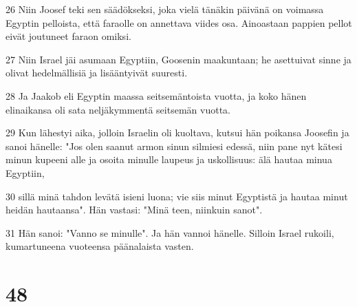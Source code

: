 \par 26 Niin Joosef teki sen säädökseksi, joka vielä tänäkin päivänä on voimassa Egyptin pelloista, että faraolle on annettava viides osa. Ainoastaan pappien pellot eivät joutuneet faraon omiksi.
\par 27 Niin Israel jäi asumaan Egyptiin, Goosenin maakuntaan; he asettuivat sinne ja olivat hedelmällisiä ja lisääntyivät suuresti.
\par 28 Ja Jaakob eli Egyptin maassa seitsemäntoista vuotta, ja koko hänen elinaikansa oli sata neljäkymmentä seitsemän vuotta.
\par 29 Kun lähestyi aika, jolloin Israelin oli kuoltava, kutsui hän poikansa Joosefin ja sanoi hänelle: "Jos olen saanut armon sinun silmiesi edessä, niin pane nyt kätesi minun kupeeni alle ja osoita minulle laupeus ja uskollisuus: älä hautaa minua Egyptiin,
\par 30 sillä minä tahdon levätä isieni luona; vie siis minut Egyptistä ja hautaa minut heidän hautaansa". Hän vastasi: "Minä teen, niinkuin sanot".
\par 31 Hän sanoi: "Vanno se minulle". Ja hän vannoi hänelle. Silloin Israel rukoili, kumartuneena vuoteensa päänalaista vasten.

\chapter{48}

